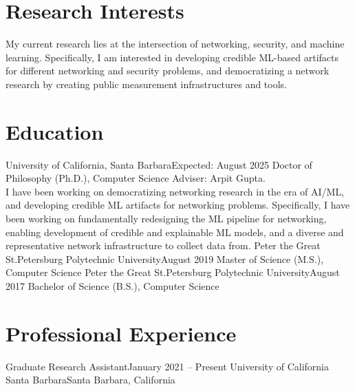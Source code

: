 \documentclass{scv}
\begin{document}

\section{Research Interests}
    \justifying
    My current research lies at the intersection of networking, security, and machine learning. 
    Specifically, I am interested in developing credible ML-based artifacts for different networking and security problems,
    and democratizing a network research by creating public measurement infrastructures and tools.

\section{Education}
  \resumeSubHeadingListStart
    \resumeSubheadingWithText
      {University of California, Santa Barbara}{Expected: August 2025}
      {Doctor of Philosophy (Ph.D.), Computer Science}{}
      {Adviser: Arpit Gupta.\\
        I have been working on democratizing networking research in the era of AI/ML, 
        and developing credible ML artifacts for networking problems. 
        Specifically, I have been working on fundamentally redesigning the ML pipeline for networking, 
        enabling development of credible and explainable ML models, and a diverse and representative network 
        infrastructure to collect data from.}{}
    \resumeSubheading
      {Peter the Great St.Petersburg Polytechnic University}{August 2019}
      {Master of Science (M.S.), Computer Science}{}
    \resumeSubheading
      {Peter the Great St.Petersburg Polytechnic University}{August 2017}
      {Bachelor of Science (B.S.), Computer Science}{}
  \resumeSubHeadingListEnd
    
\section{Professional Experience}
  \resumeSubHeadingListStart

    \resumeSubheading 
      {Graduate Research Assistant}{January 2021 -- Present}
      {University of California Santa Barbara}{Santa Barbara, California}
      \resumeItemListStart
      \resumeItemListEnd
\end{document}
